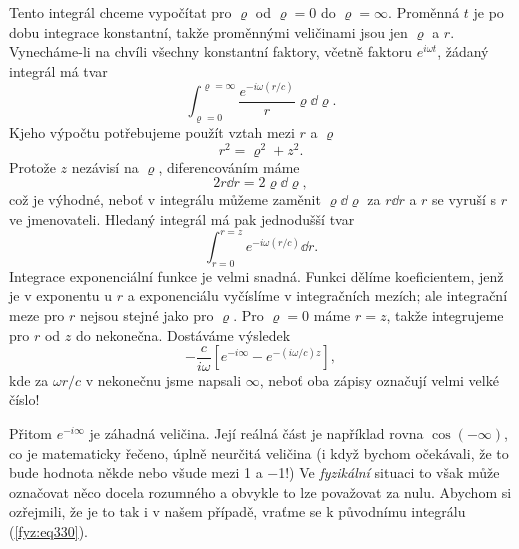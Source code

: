 {    Tento integrál chceme vypočítat pro \(\varrho\) od \(\varrho = 0\) do \(\varrho = \infty\). 
    Proměnná \(t\) je po dobu integrace konstantní, takže proměnnými veličinami jsou jen 
    \(\varrho\) a \(r\). Vynecháme-li na chvíli všechny konstantní faktory, včetně faktoru 
    \(e^{i\omega t}\), žádaný integrál má tvar
    \begin{equation}\label{fyz:eq328}
      \int_{\varrho=0}^{\varrho=\infty}\frac{e^{-i\omega(r/c)}}{r}\varrho\dd{\varrho}.
    \end{equation}
    Kjeho výpočtu potřebujeme použít vztah mezi \(r\) a \(\varrho\) 
    \begin{equation}\label{fyz:eq329}
      r^2 = \varrho^2 + z^2.
    \end{equation}
    Protože \(z\) nezávisí na \(\varrho\), diferencováním máme 
    \begin{equation*}
      2r\dd{r} = 2\varrho\dd{\varrho},
    \end{equation*}
    což je výhodné, neboť v integrálu můžeme zaměnit \(\varrho\dd{\varrho}\) za \(r\dd{r}\) a \(r\) 
    se vyruší s \(r\) ve jmenovateli. Hledaný integrál má pak jednodušší tvar
    \begin{equation}\label{fyz:eq330}
      \int_{r=0}^{r=z}e^{-i\omega(r/c)}\dd{r}.
    \end{equation}
    Integrace exponenciální funkce je velmi snadná. Funkci dělíme koeficientem, jenž je v exponentu 
    u \(r\) a exponenciálu vyčíslíme v integračních mezích; ale integrační meze pro \(r\) nejsou 
    stejné jako pro \(\varrho\). Pro \(\varrho = 0\) máme \(r = z\), takže integrujeme pro \(r\) od 
    \(z\) do nekonečna. Dostáváme výsledek
    \begin{equation}\label{fyz:eq331}
      -\frac{c}{i\omega}\left[e^{-i\infty} - e^{-(i\omega/c)z}\right],
    \end{equation}
    kde za \(\omega r/c\) v nekonečnu jsme napsali \(\infty\), neboť oba zápisy označují velmi 
    velké číslo!
    
    Přitom \(e^{-i\infty}\) je záhadná veličina. Její reálná část je například rovna 
    \(\cos(-\infty)\), co je matematicky řečeno, úplně neurčitá veličina (i když bychom očekávali, 
    že to bude hodnota někde nebo všude mezi \num{+1} a \num{-1}!) Ve \emph{fyzikální} situaci to 
    však může označovat něco docela rozumného a obvykle to lze považovat za nulu. Abychom si 
    ozřejmili, že je to tak i v našem případě, vraťme se k původnímu integrálu (\ref{fyz:eq330}).
    
}
